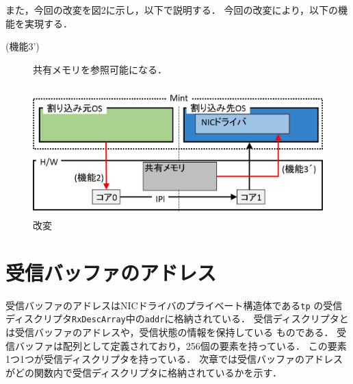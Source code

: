 \documentclass[12pt]{jsarticle}
\begin{document}
また，今回の改変を図2に示し，以下で説明する．
今回の改変により，以下の機能を実現する．


\begin{description}
    \item[(機能3’)] 共有メモリを参照可能になる．
\end{description}



\begin{figure}[t]
    \begin{center}
        \includegraphics[height=5.0cm]{./fig2.jpg}
        \caption{改変}
        \label{fig2}
    \end{center}
\end{figure}

\section{受信バッファのアドレス}
受信バッファのアドレスはNICドライバのプライベート構造体である{\tt tp}
の受信ディスクリプタ{\tt RxDescArray}中の{\tt addr}に格納されている．
受信ディスクリプタとは受信バッファのアドレスや，受信状態の情報を保持している
ものである．
受信バッファは配列として定義されており，256個の要素を持っている．
この要素1つ1つが受信ディスクリプタを持っている．
次章では受信バッファのアドレスがどの関数内で受信ディスクリプタに格納されているかを示す．
\end{document}
